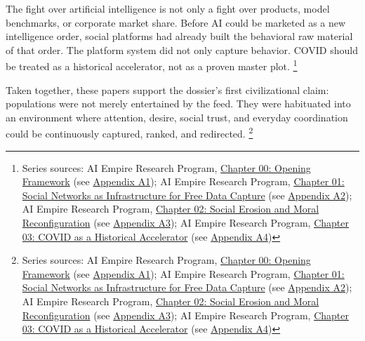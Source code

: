 \documentclass[
  american,
  11pt,
  letterpaper,
]{article}
\begin{document}
The fight over artificial intelligence is not only a fight over
products, model benchmarks, or corporate market share. Before AI could
be marketed as a new intelligence order, social platforms had already
built the behavioral raw material of that order. The platform system did
not only capture behavior. COVID should be treated as a historical
accelerator, not as a proven master plot. \footnote{Series sources: AI
  Empire Research Program,
  \href{00_opening-framework_paper.html}{Chapter 00: Opening Framework}
  (see \hyperref[appendix-a1-chapter-00-opening-framework]{Appendix
  A1}); AI Empire Research Program,
  \href{01_social-networks-data-capture_paper.html}{Chapter 01: Social
  Networks as Infrastructure for Free Data Capture} (see
  \hyperref[appendix-a2-chapter-01-social-networks-as-infrastructure-for-free-data-capture]{Appendix
  A2}); AI Empire Research Program,
  \href{02_social-erosion-and-moral-reconfiguration_paper.html}{Chapter
  02: Social Erosion and Moral Reconfiguration} (see
  \hyperref[appendix-a3-chapter-02-social-erosion-and-moral-reconfiguration]{Appendix
  A3}); AI Empire Research Program,
  \href{03_covid-historical-accelerator_paper.html}{Chapter 03: COVID as
  a Historical Accelerator} (see
  \hyperref[appendix-a4-chapter-03-covid-as-a-historical-accelerator]{Appendix
  A4})}

Taken together, these papers support the dossier's first civilizational
claim: populations were not merely entertained by the feed. They were
habituated into an environment where attention, desire, social trust,
and everyday coordination could be continuously captured, ranked, and
redirected. \footnote{Series sources: AI Empire Research Program,
  \href{00_opening-framework_paper.html}{Chapter 00: Opening Framework}
  (see \hyperref[appendix-a1-chapter-00-opening-framework]{Appendix
  A1}); AI Empire Research Program,
  \href{01_social-networks-data-capture_paper.html}{Chapter 01: Social
  Networks as Infrastructure for Free Data Capture} (see
  \hyperref[appendix-a2-chapter-01-social-networks-as-infrastructure-for-free-data-capture]{Appendix
  A2}); AI Empire Research Program,
  \href{02_social-erosion-and-moral-reconfiguration_paper.html}{Chapter
  02: Social Erosion and Moral Reconfiguration} (see
  \hyperref[appendix-a3-chapter-02-social-erosion-and-moral-reconfiguration]{Appendix
  A3}); AI Empire Research Program,
  \href{03_covid-historical-accelerator_paper.html}{Chapter 03: COVID as
  a Historical Accelerator} (see
  \hyperref[appendix-a4-chapter-03-covid-as-a-historical-accelerator]{Appendix
  A4})}
\end{document}
